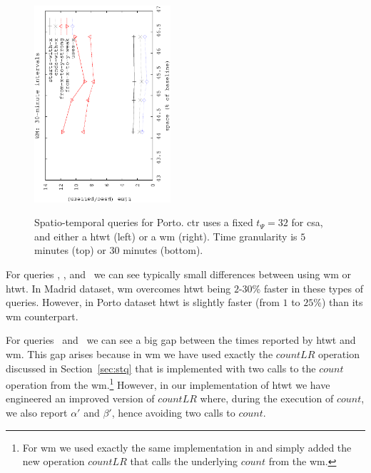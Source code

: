 \begin{figure}[!ht]
\begin{center}
			{\includegraphics[angle=-90,width=0.45\textwidth]{figures_synt/porto_wm30.eps}}
			
			
			
		\end{center}
		\vspace{-0.3cm}
		\caption{Spatio-temporal queries for Porto. \acrshort{ctr} uses a fixed $t_{\Psi}=32$ for \acrlong{csa}, 
			and either a \acrlong{htwt} (left) or a \acrlong{wm} (right). 
			Time granularity is $5$ minutes (top) or $30$ minutes (bottom). 
		}
		\label{fig:portost}
	\end{figure}





	For queries \Tswx, \Tewx, and \Tux\ we can see typically small differences between using \gls{wm} or \gls{htwt}. In 
	Madrid dataset, \gls{wm} overcomes \gls{htwt} being $2$-$30$\% faster in these types of queries. 
	However, in Porto dataset \gls{htwt} is slightly 
	faster (from $1$ to $25$\%) than its \gls{wm} counterpart.

	For queries \Tfxtys\ and \Tfxtyw\ we can see a big gap between the times reported by \gls{htwt} and \gls{wm}.
	This gap arises because in \gls{wm} we have used exactly the $countLR$ operation discussed in Section~\ref{sec:stq}
	that is implemented with two calls to the $count$ operation from the \gls{wm}.\footnote{For \gls{wm} we used exactly the same 
		implementation in \cite{CNO15} and simply added the new operation $countLR$ that calls the underlying $count$ from the
		\gls{wm}. }  
	However, in our implementation of
	\gls{htwt} we have engineered an improved version of $countLR$ where, during the execution of $count$, we also report
	$\alpha'$ and  $\beta'$, hence avoiding two calls to $count$.
	 
